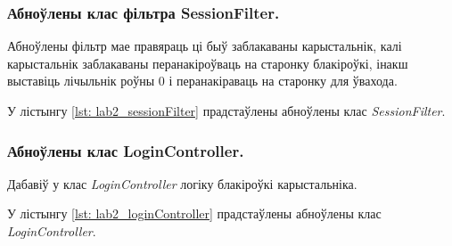 \subsubsection{Абноўлены клас фільтра SessionFilter.}

Абноўлены фільтр мае правяраць ці быў заблакаваны карыстальнік,
калі карыстальнік заблакаваны перанакіроўваць на старонку блакіроўкі,
інакш выставіць лічыльнік роўны 0 і перанакіраваць на старонку для
ўвахода.

У лістынгу \ref{lst: lab2_sessionFilter} прадстаўлены абноўлены клас
\textit{SessionFilter}.



\subsubsection{Абноўлены клас LoginController.}

Дабавіў у клас \textit{LoginController} логіку блакіроўкі карыстальніка.

У лістынгу \ref{lst: lab2_loginController} прадстаўлены абноўлены клас
\textit{LoginController}.


